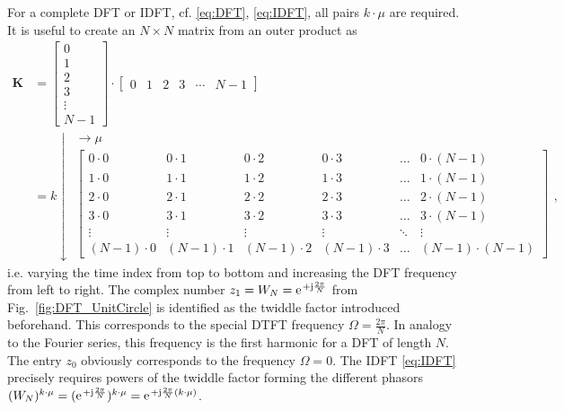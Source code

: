 \documentclass[11pt,a4paper,DIV=12]{scrartcl}
\begin{document}
%
For a complete DFT or IDFT, cf. \eqref{eq:DFT}, \eqref{eq:IDFT}, all
pairs $k \cdot \mu$ are required.
%
It is useful to create an $N \times N$ matrix from an outer product as
%
\begin{align}
\bm{K} &=
\begin{bmatrix}
0\\
1\\
2\\
3\\
\vdots\\
N-1
\end{bmatrix}
\cdot
\begin{bmatrix}
0 & 1 & 2 & 3 &\cdots & N-1
\end{bmatrix}\\
&=k \downarrow
\substack{\rightarrow \mu\\
\begin{bmatrix}
0 \cdot 0 & 0 \cdot 1 & 0 \cdot 2 & 0 \cdot 3 & \dots & 0 \cdot (N-1)\\
1 \cdot 0 & 1 \cdot 1 & 1 \cdot 2 & 1 \cdot 3 & \dots & 1 \cdot (N-1)\\
2 \cdot 0 & 2 \cdot 1 & 2 \cdot 2 & 2 \cdot 3 & \dots & 2 \cdot (N-1)\\
3 \cdot 0 & 3 \cdot 1 & 3 \cdot 2 & 3 \cdot 3 & \dots & 3 \cdot (N-1)\\
\vdots & \vdots & \vdots & \vdots & \ddots & \vdots\\
(N-1) \cdot 0 & (N-1) \cdot 1 & (N-1) \cdot 2 & (N-1) \cdot 3 & \dots &  (N-1) \cdot (N-1)
\end{bmatrix}
},
\end{align}
i.e. varying the time index from top to bottom and increasing the
DFT frequency from left to right.
%
The complex number $z_1 = W_N = \e^{+\im\frac{2\pi}{N}}$
from Fig.~\ref{fig:DFT_UnitCircle} is identified as the twiddle factor introduced
beforehand.
%
This corresponds to the special DTFT frequency $\Omega = \frac{2\pi}{N}$.
%
In analogy to the Fourier series, this frequency is the first harmonic for a DFT
of length $N$.
%
The entry $z_0$ obviously corresponds to the frequency $\Omega=0$.
%
The IDFT \eqref{eq:IDFT} precisely requires powers of the twiddle factor forming
the different phasors
$(W_N)^{k\cdot \mu} = (\e^{+\im\frac{2\pi}{N}})^{k\cdot \mu} = \e^{+\im\frac{2\pi}{N} (k\cdot \mu)}$.
%
\end{document}
